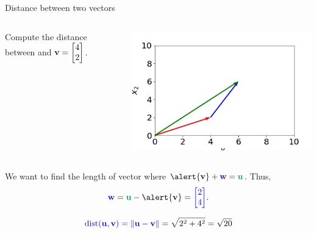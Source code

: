 \documentclass[xcolor=dvipsnames,aspectratio=169,t]{beamer}
\begin{document}
\begin{frame}{Distance between two vectors}
  \begin{columns}[T]
  \column{0.6\tw}
  \begin{example}
  Compute the distance between  and \alert{$\mathbf{v} = \begin{bmatrix} 4 \\ 2 \end{bmatrix}$}.
  \end{example}

  \column{0.4\tw}
  \includegraphics[width=0.9\tw]{images/fig-dist2.png}
  \end{columns}

  \pause
  We want to find the length of vector  where $\alert{\v} + \colorb{\w} = \colorg{\u}$.  Thus,
  \[ \colorb{\w} = \colorg{\u} - \alert{\v} = \colorb{\begin{bmatrix} 2 \\ 4 \end{bmatrix}}. \]

  \bbox
  \[ \textcolor{blue}{\mbox{dist}(\mathbf{u},\mathbf{v}) = \| \mathbf{u} - \mathbf{v} \|} = \sqrt{2^2+4^2} = \sqrt{20} \]
  \ebox
\end{frame}
\end{document}
